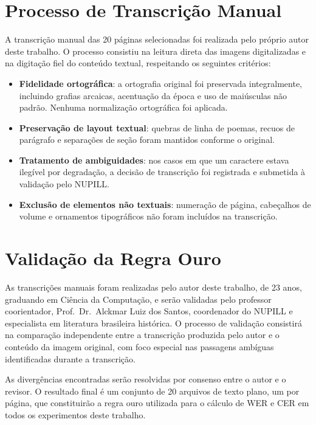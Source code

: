 \documentclass[
  12pt,
  oneside,
  a4paper,
  chapter=TITLE,
  section=TITLE,
  english,
  brazil
]{abntex2}
\begin{document}
\section{Processo de Transcrição Manual}

A transcrição manual das 20 páginas selecionadas foi realizada pelo próprio autor deste
trabalho. O processo consistiu na leitura direta das imagens digitalizadas e na digitação
fiel do conteúdo textual, respeitando os seguintes critérios:

\begin{itemize}
    \item \textbf{Fidelidade ortográfica}: a ortografia original foi preservada
    integralmente, incluindo grafias arcaicas, acentuação da época e uso de maiúsculas
    não padrão. Nenhuma normalização ortográfica foi aplicada.

    \item \textbf{Preservação de layout textual}: quebras de linha de poemas, recuos de
    parágrafo e separações de seção foram mantidos conforme o original.

    \item \textbf{Tratamento de ambiguidades}: nos casos em que um caractere estava
    ilegível por degradação, a decisão de transcrição foi registrada e submetida à
    validação pelo NUPILL.

    \item \textbf{Exclusão de elementos não textuais}: numeração de página, cabeçalhos
    de volume e ornamentos tipográficos não foram incluídos na transcrição.
\end{itemize}

\section{Validação da Regra Ouro}

As transcrições manuais foram realizadas pelo autor deste trabalho, de 23 anos,
graduando em Ciência da Computação, e serão validadas pelo professor coorientador,
Prof.\ Dr.\ Alckmar Luiz dos Santos, coordenador do NUPILL e especialista em
literatura brasileira histórica. O processo de validação consistirá na comparação
independente entre a transcrição produzida pelo autor e o conteúdo da imagem original,
com foco especial nas passagens ambíguas identificadas durante a transcrição.

As divergências encontradas serão resolvidas por consenso entre o autor e o revisor. O
resultado final é um conjunto de 20 arquivos de texto plano, um por página, que
constituirão a regra ouro utilizada para o cálculo de WER e CER em todos os experimentos
deste trabalho.
\end{document}
